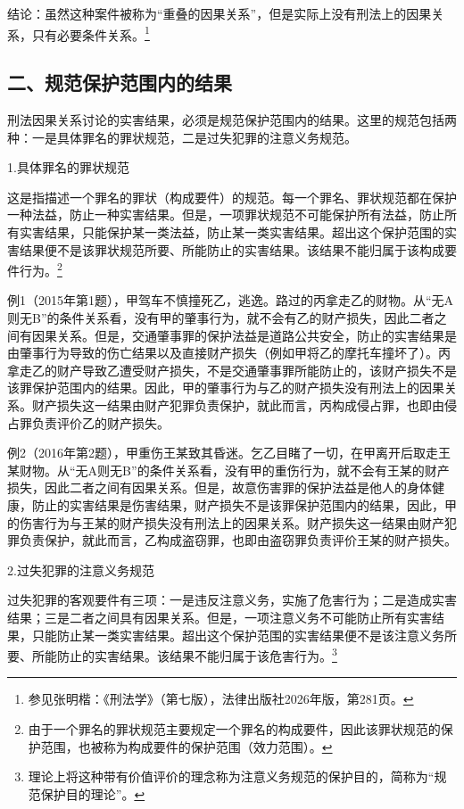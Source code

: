 结论：虽然这种案件被称为“重叠的因果关系”，但是实际上没有刑法上的因果关系，只有必要条件关系。\footnote{参见张明楷：《刑法学》（第七版），法律出版社2026年版，第281页。}

\subsection*{二、规范保护范围内的结果}

刑法因果关系讨论的实害结果，必须是规范保护范围内的结果。这里的规范包括两种：一是具体罪名的罪状规范，二是过失犯罪的注意义务规范。

1.具体罪名的罪状规范

这是指描述一个罪名的罪状（构成要件）的规范。每一个罪名、罪状规范都在保护一种法益，防止一种实害结果。但是，一项罪状规范不可能保护所有法益，防止所有实害结果，只能保护某一类法益，防止某一类实害结果。超出这个保护范围的实害结果便不是该罪状规范所要、所能防止的实害结果。该结果不能归属于该构成要件行为。\footnote{由于一个罪名的罪状规范主要规定一个罪名的构成要件，因此该罪状规范的保护范围，也被称为构成要件的保护范围（效力范围）。}

例1（2015年第1题），甲驾车不慎撞死乙，逃逸。路过的丙拿走乙的财物。从“无A则无B”的条件关系看，没有甲的肇事行为，就不会有乙的财产损失，因此二者之间有因果关系。但是，交通肇事罪的保护法益是道路公共安全，防止的实害结果是由肇事行为导致的伤亡结果以及直接财产损失（例如甲将乙的摩托车撞坏了）。丙拿走乙的财产导致乙遭受财产损失，不是交通肇事罪所能防止的，该财产损失不是该罪保护范围内的结果。因此，甲的肇事行为与乙的财产损失没有刑法上的因果关系。财产损失这一结果由财产犯罪负责保护，就此而言，丙构成侵占罪，也即由侵占罪负责评价乙的财产损失。

例2（2016年第2题），甲重伤王某致其昏迷。乞乙目睹了一切，在甲离开后取走王某财物。从“无A则无B”的条件关系看，没有甲的重伤行为，就不会有王某的财产损失，因此二者之间有因果关系。但是，故意伤害罪的保护法益是他人的身体健康，防止的实害结果是伤害结果，财产损失不是该罪保护范围内的结果，因此，甲的伤害行为与王某的财产损失没有刑法上的因果关系。财产损失这一结果由财产犯罪负责保护，就此而言，乙构成盗窃罪，也即由盗窃罪负责评价王某的财产损失。

2.过失犯罪的注意义务规范

过失犯罪的客观要件有三项：一是违反注意义务，实施了危害行为；二是造成实害结果；三是二者之间具有因果关系。但是，一项注意义务不可能防止所有实害结果，只能防止某一类实害结果。超出这个保护范围的实害结果便不是该注意义务所要、所能防止的实害结果。该结果不能归属于该危害行为。\footnote{理论上将这种带有价值评价的理念称为注意义务规范的保护目的，简称为“规范保护目的理论”。}

